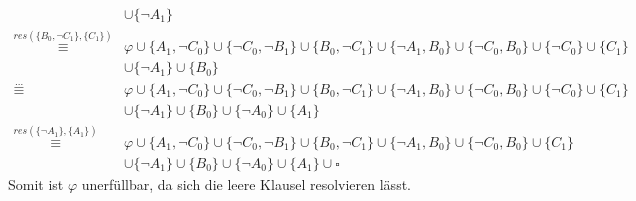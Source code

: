\documentclass[a4paper,10pt]{article}
\begin{document}
\begin{enumerate}
\begin{align*}
		&\cup \{ \neg A_1 \}\\
		\overset{res(\{ B_0, \neg C_1 \},\{C_1\})}{\equiv} &\varphi \cup \{ A_1,\neg C_0 \} \cup \{ \neg C_0, \neg B_1\} \cup \{ B_0, \neg C_1\} \cup \{\neg A_1, B_0\} \cup \{\neg C_0, B_0 \} \cup \{\neg C_0\} \cup \{C_1\} \\
		&\cup \{ \neg A_1 \} \cup \{ B_0 \}\\
		\overset{...}{\equiv} &\varphi \cup \{ A_1,\neg C_0 \} \cup \{ \neg C_0, \neg B_1\} \cup \{ B_0, \neg C_1\} \cup \{\neg A_1, B_0\} \cup \{\neg C_0, B_0 \} \cup \{\neg C_0\} \cup \{C_1\} \\
		&\cup \{ \neg A_1 \} \cup \{ B_0 \} \cup \{\neg A_0\} \cup \{A_1\} \\
		\overset{res(\{\neg A_1\},\{ A_1 \})}{\equiv} &\varphi \cup \{ A_1,\neg C_0 \} \cup \{ \neg C_0, \neg B_1\} \cup \{ B_0, \neg C_1\} \cup \{\neg A_1, B_0\} \cup \{\neg C_0, B_0 \} \cup \{C_1\} \\
		&\cup \{ \neg A_1 \} \cup \{ B_0 \} \cup \{\neg A_0\} \cup \{A_1\} \cup \square
	\end{align*}
	Somit ist $\varphi$ unerfüllbar, da sich die leere Klausel resolvieren lässt.
	
	\end{enumerate}
\end{document}
